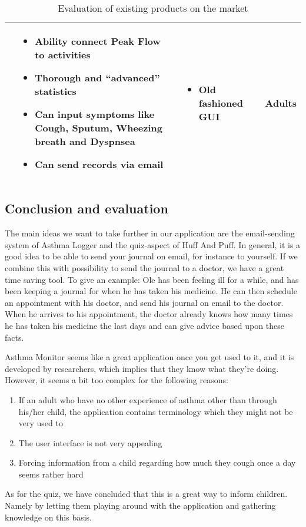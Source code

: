 \begin{sidewaystable}
\begin{tabular}{ | p{4.0cm} | p{5.5cm} | p{5.5cm} | p{4cm}|}
	&
	\begin{itemize}
	  \item Ability connect Peak Flow to activities
	  \item Thorough and ``advanced'' statistics
	  \item Can input symptoms like Cough, Sputum, Wheezing breath and Dyspnsea 
	  \item Can send records via email
	\end{itemize}
	&
	\begin{itemize}
	  \item Old fashioned GUI
	\end{itemize}
	& 
	Adults
	\\ \hline
	\end{tabular}
	\caption{Evaluation of existing products on the market}
\end{sidewaystable}

\subsection{Conclusion and evaluation}
\label{sec:existingconcl}

The main ideas we want to take further in our application are the email-sending system of Asthma Logger and the quiz-aspect of Huff And Puff. In general, it is a good idea to be able to send your journal on email, for instance to yourself. If we combine this with possibility to send the journal to a doctor, we have a great time saving tool. To give an example: Ole has been feeling ill for a while, and has been keeping a journal for when he has taken his medicine. He can then schedule an appointment with his doctor, and send his journal on email to the doctor. When he arrives to his appointment, the doctor already knows how many times he has taken his medicine the last days and can give advice based upon these facts. 

Asthma Monitor seems like a great application once you get used to it, and it is developed by researchers, which implies that they know what they're doing. However, it seems a bit too complex for the following reasons:
\begin{enumerate}
  \item If an adult who have no other experience of asthma other than through his/her child, the application contains terminology which they might not be very used to
  \item The user interface is not very appealing
  \item Forcing information from a child regarding how much they cough once a day seems rather hard 
\end{enumerate}   

As for the quiz, we have concluded that this is a great way to inform children. Namely by letting them playing around with the application and gathering knowledge on this basis. 



